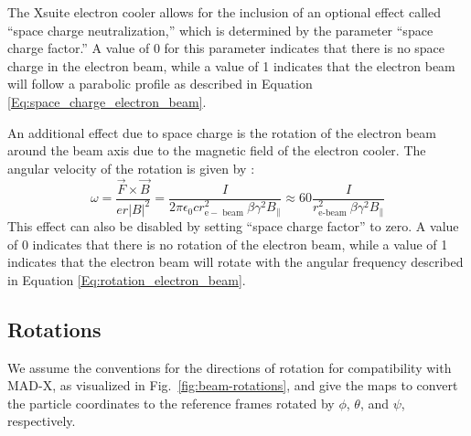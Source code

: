 The Xsuite electron cooler allows for the inclusion of an optional effect called ``space charge neutralization,'' which is determined by the parameter ``space charge factor.'' A value of 0 for this parameter indicates that there is no space charge in the electron beam, while a value of 1 indicates that the electron beam will follow a parabolic profile as described in Equation \ref{Eq:space_charge_electron_beam}.

An additional effect due to space charge is the rotation of the electron beam around the beam axis due to the magnetic field of the electron cooler. The angular velocity of the rotation is given by \cite{poth1990electron}:
\begin{equation}
\omega
=\frac{\vec{F} \times \vec{B}}{e r|B|^2}
=\frac{I}{2 \pi \epsilon_0 c r_{\mathrm{e}-\text { beam }}^2 \beta \gamma^2 B_{\|}}
\approx 60 \frac{I}{r_{\mathrm{e} \text {-beam }}^2 \beta \gamma^2 B_{\|}}
\label{Eq:rotation_electron_beam}
\end{equation}
This effect can also be disabled by setting ``space charge factor'' to zero. A value of 0 indicates that there is no rotation of the electron beam, while a value of 1 indicates that the electron beam will rotate with the angular frequency described in Equation \ref{Eq:rotation_electron_beam}.


\subsection{Rotations}

We assume the conventions for the directions of rotation for compatibility with \mbox{MAD-X}, as visualized in Fig.~\ref{fig:beam-rotations}, and give the maps to convert the particle coordinates to the reference frames rotated by $\phi$, $\theta$, and $\psi$, respectively.

